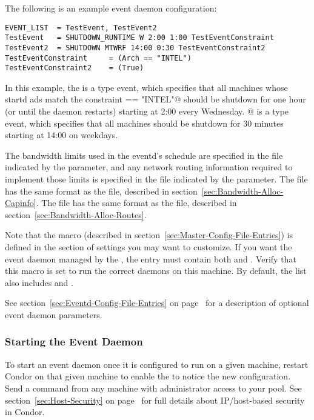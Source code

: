 The following is an example event daemon configuration:
\begin{verbatim}
EVENT_LIST	= TestEvent, TestEvent2
TestEvent	= SHUTDOWN_RUNTIME W 2:00 1:00 TestEventConstraint
TestEvent2	= SHUTDOWN MTWRF 14:00 0:30 TestEventConstraint2
TestEventConstraint		= (Arch == "INTEL")
TestEventConstraint2	= (True)
\end{verbatim}

In this example, the \verb@TestEvent@ is a 
type event, which
specifies that all machines whose startd ads match the constraint
\verb@Arch == "INTEL"@ should be shutdown for one hour (or until the
 daemon restarts) starting at 2:00 every Wednesday.
@ is a  type event, which specifies
that all machines should be shutdown for 30 minutes starting at
14:00 on weekdays.

The bandwidth limits used in the eventd's schedule are specified in
the file indicated by the  parameter, and
any network routing information required to implement those limits is
specified in the file indicated by the 
parameter.
The  file has the same
format as the  file, described in
section~\ref{sec:Bandwidth-Alloc-Capinfo}.
The  file has the same
format as the  file, described in
section~\ref{sec:Bandwidth-Alloc-Routes}.

Note that the  macro (described in
section~\ref{sec:Master-Config-File-Entries}) is defined in the
section of settings you may want to customize.
If you want the event daemon managed by the , the
 entry must contain both 
 and .
Verify that this macro is set to run the correct daemons on
this machine.  By default, the list also includes
 and .

See section~\ref{sec:Eventd-Config-File-Entries} on
page~\pageref{sec:Eventd-Config-File-Entries} for a description of
optional event daemon parameters.

\subsubsection{\label{sec:Start-EventD} 
Starting the Event Daemon} 

To start an event daemon once it is configured to run on a given
machine, restart Condor on that given machine to enable
the  to notice the new configuration.
Send a  command from any machine
with administrator access to your pool.
See section~\ref{sec:Host-Security} on
page~\pageref{sec:Host-Security} for full details about IP/host-based
security in Condor.

